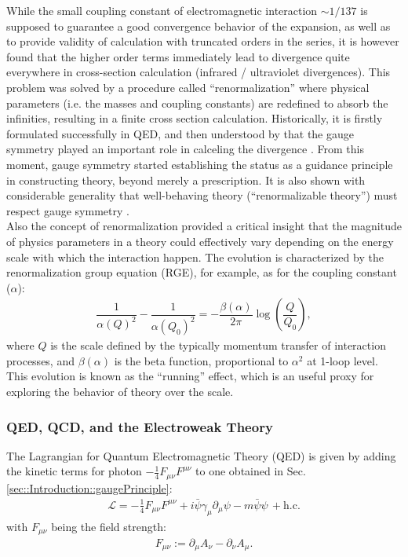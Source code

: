 While the small coupling constant of electromagnetic interaction $\sim 1/137$ is supposed to guarantee a good convergence behavior of the expansion, as well as to provide validity of calculation with truncated orders in the series, it is however found that the higher order terms immediately lead to divergence quite everywhere in cross-section calculation (infrared / ultraviolet divergences). This problem was solved by a procedure called ``renormalization'' 
where physical parameters (i.e. the masses and coupling constants) are redefined to absorb the infinities, resulting in a finite cross section calculation. Historically, it is firstly formulated successfully in QED, and then understood by that the gauge symmetry played an important role in calceling the divergence \cite{Ward1950}\cite{Takahashi1957}. From this moment, gauge symmetry started establishing the status as a guidance principle in constructing theory, beyond merely a prescription. It is also shown with considerable generality that well-behaving theory (``renormalizable theory'') must respect gauge symmetry \cite{tHooft1972}. \\

Also the concept of renormalization provided a critical insight that the magnitude of physics parameters in a theory could effectively vary depending on the energy scale with which the interaction happen. The evolution is characterized by the renormalization group equation (RGE), for example, as for the coupling constant ($\alpha$): 
\begin{align}
\dfrac{1}{\alpha(Q)^2}-\dfrac{1}{\alpha(Q_0)^2} = -\dfrac{\beta(\alpha)}{2\pi} \log{\left(\dfrac{Q}{Q_0}\right)},
\end{align}
where $Q$ is the scale defined by the typically momentum transfer of interaction processes, and $\beta(\alpha)$ is the beta function, proportional to $\alpha^2$ at 1-loop level. This evolution is known as the ``running'' effect, which is an useful proxy for exploring the behavior of theory over the scale. \\


\subsubsection{QED, QCD, and the Electroweak Theory}
The Lagrangian for Quantum Electromagnetic Theory (QED) is given by adding the kinetic terms for photon $-\frac{1}{4}F_{\mu\nu} F^{\mu\nu}$ to one obtained in Sec. \ref{sec::Introduction::gaugePrinciple}:
\begin{align}
\mathcal{L} = -\frac{1}{4}F_{\mu\nu} F^{\mu\nu} + i \bar{\psi} \gamma_\mu \partial_\mu \psi - m \bar{\psi}\psi \, + \mathrm{h.c.}
\end{align}
with $F_{\mu\nu}$ being the field strength:
\begin{align}
F_{\mu\nu} := \partial_\mu A_\nu - \partial_\nu A_\mu.
\end{align}


